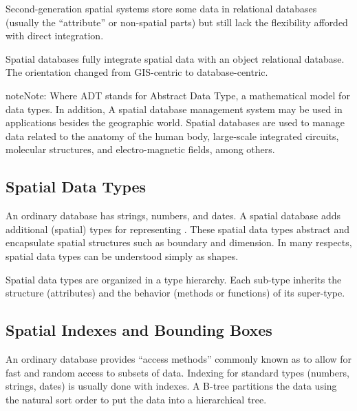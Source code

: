 \documentclass[a4paper,11pt,english]{sphinxmanual}
\begin{document}
Second-generation spatial systems store some data in relational databases (usually the “attribute” or non-spatial parts) but still lack the flexibility afforded with direct integration.


Spatial databases fully integrate spatial data with an object relational database. The orientation changed from GIS-centric to database-centric.

\noindent{}

\begin{sphinxadmonition}{note}{Note:}
Where ADT stands for Abstract Data Type, a mathematical model for data types. In addition, A spatial database management system may be used in applications besides the geographic world.  Spatial databases are used to manage data related to the anatomy of the human body, large-scale integrated circuits, molecular structures, and electro-magnetic fields, among others.
\end{sphinxadmonition}


\subsection{Spatial Data Types}
\label{\detokenize{introduction:spatial-data-types}}
An ordinary database has strings, numbers, and dates. A spatial database adds additional (spatial) types for representing . These spatial data types abstract and encapsulate spatial structures such as boundary and dimension. In many respects, spatial data types can be understood simply as shapes.


Spatial data types are organized in a type hierarchy.  Each sub-type inherits the structure (attributes) and the behavior (methods or functions) of its super-type.


\subsection{Spatial Indexes and Bounding Boxes}
\label{\detokenize{introduction:spatial-indexes-and-bounding-boxes}}
An ordinary database provides “access methods” \textendash{} commonly known as  \textendash{} to allow for fast and random access to subsets of data.  Indexing for standard types (numbers, strings, dates) is usually done with  indexes.  A B-tree partitions the data using the natural sort order to put the data into a hierarchical tree.
\end{document}
